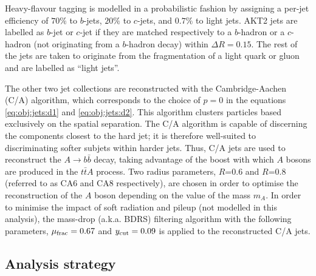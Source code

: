 Heavy-flavour tagging is modelled in a probabilistic fashion by assigning a per-jet efficiency of $70\%$ to $b$-jets, $20\%$ to $c$-jets, and $0.7\%$ to light jets.  AKT2 jets are labelled as $b$-jet or $c$-jet if they are matched respectively to a $b$-hadron or a $c$-hadron (not originating from a $b$-hadron decay) within $\Delta R= 0.15$. The rest of the jets are taken to originate from the fragmentation of a light quark or gluon and are labelled as ``light  jets''.  \par The other two jet collections are reconstructed with the Cambridge-Aachen (C/A) algorithm, which corresponds to the choice of $p=0$ in the equations \ref{eq:obj:jets:d1} and \ref{eq:obj:jets:d2}. This algorithm clusters particles based exclusively on the spatial separation. The C/A algorithm is capable of discerning the components closest to the hard jet; it is
therefore well-suited to discriminating softer subjets within harder jets. Thus, C/A jets are used  to reconstruct the $A\to b \bar{b}$ decay, taking advantage of the boost with which $A$ bosons are produced in the $t\bar{t}A$ process.  Two radius parameters, $R$=0.6 and $R$=0.8 (referred to as CA6 and CA8 respectively), are chosen in order to optimise the reconstruction of the $A$ boson depending on the value of the mass $m_A$.
In order to minimise the impact of soft radiation and pileup (not modelled in this analysis), the mass-drop (a.k.a. BDRS) filtering algorithm \cite{Butterworth:2008iy} with the following parameters, $\mu_{\rm frac}=0.67$ and $y_{\rm cut}=0.09$ is applied to the reconstructed C/A jets. 


\subsection{Analysis strategy}


